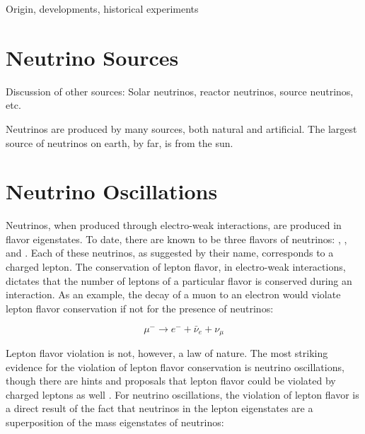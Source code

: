 


Origin, developments, historical experiments


\section{Neutrino Sources}
Discussion of other sources: Solar neutrinos, reactor neutrinos, source neutrinos, etc.

Neutrinos are produced by many sources, both natural and artificial.  The largest source of neutrinos on earth, by far, is from the sun.

\section{Neutrino Oscillations}

Neutrinos, when produced through electro-weak interactions, are produced in flavor eigenstates.  To date, there are known to be three flavors of neutrinos: \nue, \numu, and \nutau.  Each of these neutrinos, as suggested by their name, corresponds to a charged lepton.  The conservation of lepton flavor, in electro-weak interactions, dictates that the number of leptons of a particular flavor is conserved during an interaction.  As an example, the decay of a muon to an electron would violate lepton flavor conservation if not for the presence of neutrinos:

\begin{equation}
\mu^- \rightarrow e^- + \bar{\nu}_e + \nu_\mu
\end{equation}

Lepton flavor violation is not, however, a law of nature.  The most striking evidence for the violation of lepton flavor conservation is neutrino oscillations, though there are hints and proposals that lepton flavor could be violated by charged leptons as well \cite{mu2e}.  For neutrino oscillations, the violation of lepton flavor is a direct result of the fact that neutrinos in the lepton eigenstates are a superposition of the mass eigenstates of neutrinos:

